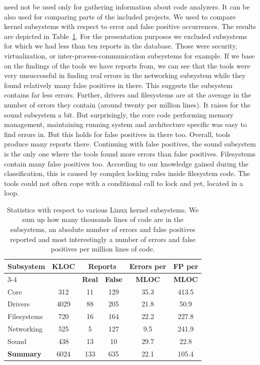 \cdb need not be used only for gathering information about code analyzers.
It can be also used for comparing parts of the included projects. We used \cdb
to compare kernel subsystems with respect to error and false positive
occurrences. The results are depicted in Table~\ref{tab:cdb_stats}. For the
presentation purposes we excluded subsystems for which we had less than ten
reports in the database. Those were security, virtualization, or
inter-process-communication subsystems for example. If we base on the findings
of the tools we have reports from, we can see that the tools were very
unsuccessful in finding real errors in the networking subsystem while they
found relatively many false positives in there. This suggests the subsystem
contains far less errors. Further, drivers and filesystems are at the average
in the number of errors they contain (around twenty per million lines). It
raises for the sound subsystem a bit. But surprisingly, the core code
performing memory management, maintaining running system and architecture
specific was easy to find errors in. But this holds for false positives in
there too. Overall, tools produce many reports there. Continuing with false
positives, the sound subsystem is the only one where the tools found more
errors than false positives. Filesystems contain many false positives too.
According to our knowledge gained during the classification, this is caused by
complex locking rules inside filesystem code. The tools could not often cope
with a conditional call to lock and yet, located in a loop.

\begin{table}[tb]
\begin{center}
\setlength{\tabcolsep}{2.5pt}
\begin{tabular}{|l||c|c|c|c|c|} \hline
\multirow{2}{*}{\textbf{Subsystem}} &
  \multirow{2}{*}{\textbf{KLOC}} &
  \multicolumn{2}{c|}{\textbf{Reports}} &
  \textbf{Errors per} & \textbf{FP per} \\ \cline{3-4}
&& \textbf{Real} & \textbf{False} & \textbf{MLOC} & \textbf{MLOC} \\
  \hline

Core        &  312 & 11 & 129 &  35.3 & 413.5 \\ %
Drivers     & 4029 & 88 & 205 &  21.8 &  50.9 \\
Filesystems &  720 & 16 & 164 &  22.2 & 227.8 \\
Networking  &  525 &  5 & 127 &   9.5 & 241.9 \\
Sound       &  438 & 13 &  10 &  29.7 &  22.8 \\ \hline

\textbf{Summary} & 6024 & 133 & 635 & 22.1 & 105.4 \\ \hline
\end{tabular}
\end{center}
\caption{Statistics with respect to various Linux kernel subsystems. We sum up
how many thousands lines of code are in the subsystems, an absolute number of
errors and false positives reported and most interestingly a number of errors
and false positives per million lines of code.}
\label{tab:cdb_stats}
\end{table}


